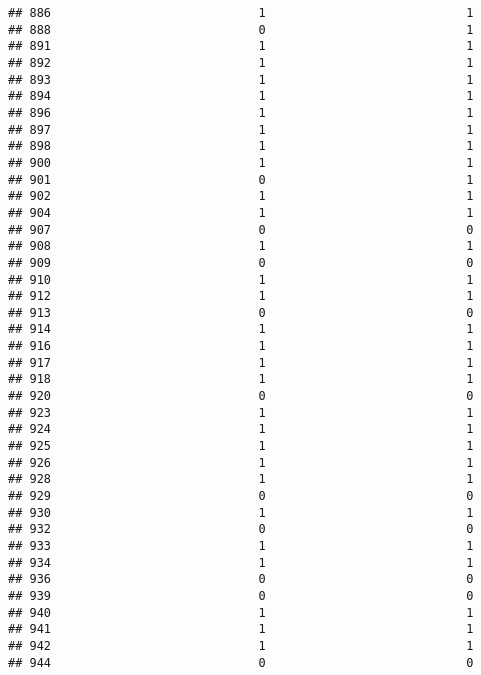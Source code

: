 \documentclass[
]{article}
\begin{document}
\begin{verbatim}
## 886                             1                            1
## 888                             0                            1
## 891                             1                            1
## 892                             1                            1
## 893                             1                            1
## 894                             1                            1
## 896                             1                            1
## 897                             1                            1
## 898                             1                            1
## 900                             1                            1
## 901                             0                            1
## 902                             1                            1
## 904                             1                            1
## 907                             0                            0
## 908                             1                            1
## 909                             0                            0
## 910                             1                            1
## 912                             1                            1
## 913                             0                            0
## 914                             1                            1
## 916                             1                            1
## 917                             1                            1
## 918                             1                            1
## 920                             0                            0
## 923                             1                            1
## 924                             1                            1
## 925                             1                            1
## 926                             1                            1
## 928                             1                            1
## 929                             0                            0
## 930                             1                            1
## 932                             0                            0
## 933                             1                            1
## 934                             1                            1
## 936                             0                            0
## 939                             0                            0
## 940                             1                            1
## 941                             1                            1
## 942                             1                            1
## 944                             0                            0

\end{verbatim}
\end{document}
